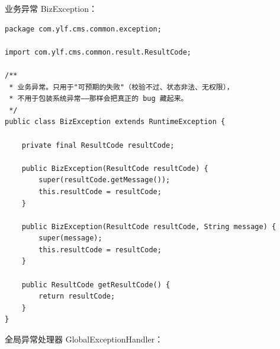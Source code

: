 \documentclass[zihao=-4,UTF8,openany]{ctexart}
\renewcommand{\_}{\textunderscore\allowbreak}
\begin{document}
业务异常 BizException：

\begin{lstlisting}
package com.ylf.cms.common.exception;

import com.ylf.cms.common.result.ResultCode;

/**
 * 业务异常。只用于"可预期的失败"（校验不过、状态非法、无权限），
 * 不用于包装系统异常——那样会把真正的 bug 藏起来。
 */
public class BizException extends RuntimeException {

    private final ResultCode resultCode;

    public BizException(ResultCode resultCode) {
        super(resultCode.getMessage());
        this.resultCode = resultCode;
    }

    public BizException(ResultCode resultCode, String message) {
        super(message);
        this.resultCode = resultCode;
    }

    public ResultCode getResultCode() {
        return resultCode;
    }
}
\end{lstlisting}

全局异常处理器 GlobalExceptionHandler：
\end{document}
